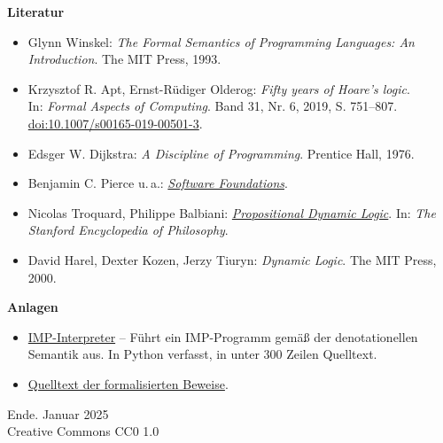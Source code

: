 \documentclass[8pt,fleqn,aspectratio=169]{beamer}
\newcommand{\modest}[1]{{\small\color{gray}#1}}
\newcommand{\strong}[1]{\textsf{\textbf{#1}}}
\begin{document}
\begin{frame}
\strong{Literatur}
\begin{itemize}
\item Glynn Winskel:
  \emph{The Formal Semantics of Programming Languages: An Introduction}.
  The MIT Press, 1993.
\item Krzysztof R. Apt, Ernst-Rüdiger Olderog:
  \emph{Fifty years of Hoare’s logic}.\\
  In: \emph{Formal Aspects of Computing}.
  Band 31, Nr. 6, 2019, S. 751--807.\\
  \href{https://doi.org/10.1007/s00165-019-00501-3}{doi:10.1007/s00165-019-00501-3}.
\item Edsger W. Dijkstra:
  \emph{A Discipline of Programming}. Prentice Hall, 1976.
\item Benjamin C. Pierce u.\,a.:
  \href{https://softwarefoundations.cis.upenn.edu/}{\emph{Software Foundations}}.
\item Nicolas Troquard, Philippe Balbiani:
  \href{https://plato.stanford.edu/entries/logic-dynamic/}{\emph{Propositional Dynamic Logic}}.
  In: \emph{The Stanford Encyclopedia of Philosophy}.
\item David Harel, Dexter Kozen, Jerzy Tiuryn:
  \emph{Dynamic Logic}. The MIT Press, 2000.
\end{itemize}
\end{frame}

\begin{frame}
\strong{Anlagen}

\begin{itemize}
\item\href{https://github.com/JohnBSmith/misc/tree/master/cs/imp}{%
IMP-Interpreter} -- Führt ein IMP-Programm gemäß der denotationellen
Semantik aus. In Python verfasst, in unter 300 Zeilen Quelltext.

\item\href{https://github.com/JohnBSmith/misc/tree/master/cs/imp/proofs}{%
Quelltext der formalisierten Beweise}.
\end{itemize}
\end{frame}

\begin{frame}
Ende.
\vfill\hfill\modest{Januar 2025}\\
\hfill\modest{Creative Commons CC0 1.0}
\end{frame}
\end{document}
